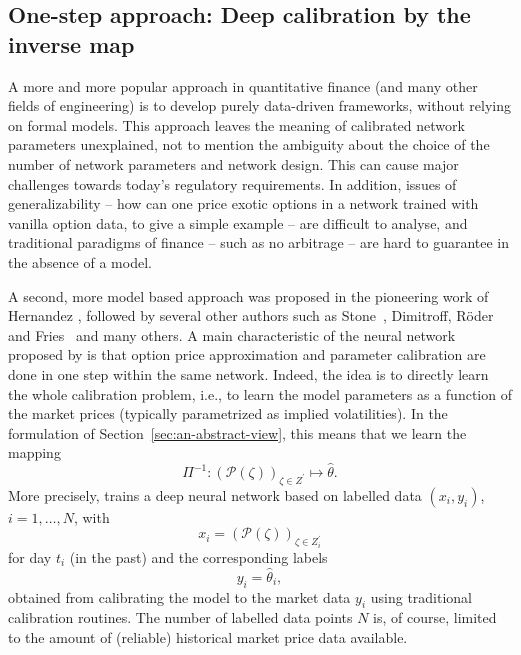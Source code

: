\documentclass{article}
\theoremstyle{remark}
\begin{document}
\subsection{One-step approach: Deep calibration by the inverse map}
\label{sec:hernandez}
A more and more popular approach in quantitative finance (and many other
fields of engineering) is to develop purely data-driven frameworks, without
relying on formal models. This approach leaves the meaning of calibrated network
parameters unexplained, not to mention the ambiguity about the choice of the
number of network parameters and network design. This can cause major
challenges towards today's regulatory requirements. In addition, issues of
generalizability -- how can one price exotic options in a network trained with
vanilla option data, to give a simple example -- are difficult to analyse, and
traditional paradigms of finance -- such as no arbitrage -- are hard to
guarantee in the absence of a model.

A second, more model based approach was proposed in the pioneering work of
Hernandez \cite{Hernandez}, followed by several other authors such as
Stone~\cite{Stone}, Dimitroff, R\"oder and Fries~\cite{HestonConvolutional} and
many others. A main characteristic of the neural network proposed by
\cite{Hernandez} is that option price approximation and parameter calibration
are done in one step within the same network.
Indeed, the idea is to directly learn the whole calibration problem, i.e., to
learn the model parameters as a function of the market prices (typically
parametrized as implied volatilities). In the formulation of
Section~\ref{sec:an-abstract-view}, this means that we learn the mapping
\begin{equation*}
  \Pi^{-1}: \left( \mathcal{P}(\zeta) \right)_{\zeta \in Z^\prime} \mapsto \widehat{\theta}.
\end{equation*}
More precisely, \cite{Hernandez} trains a deep neural network based on
labelled data $(x_i, y_i)$, $i = 1, \ldots, N$, with
\begin{equation*}
  x_i = \left( \mathcal{P}(\zeta) \right)_{\zeta \in Z^\prime_i}
\end{equation*}
for day $t_i$ (in the past) and the corresponding labels
\begin{equation*}
  y_i = \widehat{\theta}_i,
\end{equation*}
obtained from calibrating the model to the market data $y_i$ using traditional
calibration routines. The number of labelled data points $N$ is, of course,
limited to the amount of (reliable) historical market price data available.
\end{document}
